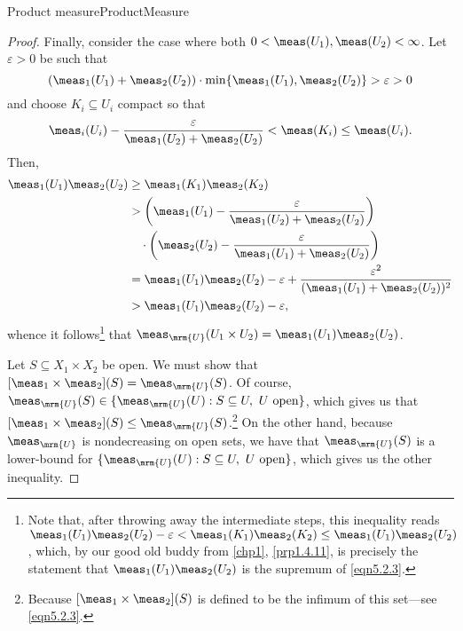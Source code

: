 \begin{thm}{Product measure}{ProductMeasure}
\begin{proof}
Finally, consider the case where both $0<\meas (U_1),\meas (U_2)<\infty$.  Let $\varepsilon >0$ be such that
\begin{equation}
(\meas _1(U_1)+\meas _2(U_2))\cdot \min \{ \meas _1(U_1),\meas _2(U_2)\} >\varepsilon >0
\end{equation}
and choose $K_i\subseteq U_i$ compact so that
\begin{equation}
\meas _i(U_i)-\frac{\varepsilon}{\meas _1(U_2)+\meas _2(U_2)}<\meas (K_i)\leq \meas (U_i).
\end{equation}
Then,
\begin{equation}\label{eqn5.2.16}
\begin{split}
\meas _1(U_1)\meas _2(U_2) & \geq \meas _1(K_1)\meas _2(K_2) \\
& >\left( \meas _1(U_1)-\frac{\varepsilon}{\meas _1(U_2)+\meas _2(U_2)}\right) \\
& \quad \cdot \left( \meas _2(U_2)-\frac{\varepsilon}{\meas _1(U_1)+\meas _2(U_2)}\right) \\
& =\meas _1(U_1)\meas _2(U_2)-\varepsilon +\frac{\varepsilon ^2}{(\meas _1(U_1)+\meas _2(U_2))^2} \\
& >\meas _1(U_1)\meas _2(U_2)-\varepsilon ,
\end{split}
\end{equation}
whence it follows\footnote{Note that, after throwing away the intermediate steps, this inequality reads $\meas _1(U_1)\meas _2(U_2)-\varepsilon <\meas _1(K_1)\meas _2(K_2)\leq \meas _1(U_1)\meas _2(U_2)$, which, by our good old buddy from \cref{chp1}, \cref{prp1.4.11}, is precisely the statement that $\meas _1(U_1)\meas _2(U_2)$ is the supremum of \eqref{eqn5.2.3}.} that $\meas _{\mrm{U}}(U_1\times U_2)=\meas _1(U_1)\meas _2(U_2)$.

Let $S\subseteq X_1\times X_2$ be open.  We must show that $[\meas _1\times \meas _2](S)=\meas _{\mrm{U}}(S)$.  Of course, $\meas _{\mrm{U}}(S)\in \{ \meas _{\mrm{U}}(U):S\subseteq U,\ U\text{ open}\}$, which gives us that $[\meas _1\times \meas _2](S)\leq \meas _{\mrm{U}}(S)$.\footnote{Because $[\meas _1\times \meas _2](S)$ is defined to be the infimum of this set---see \eqref{eqn5.2.3}.}  On the other hand, because $\meas _{\mrm{U}}$ is nondecreasing on open sets, we have that $\meas _{\mrm{U}}(S)$ is a lower-bound for $\{ \meas _{\mrm{U}}(U):S\subseteq U,\ U\text{ open}\}$, which gives us the other inequality.


\end{proof}
\end{thm}
